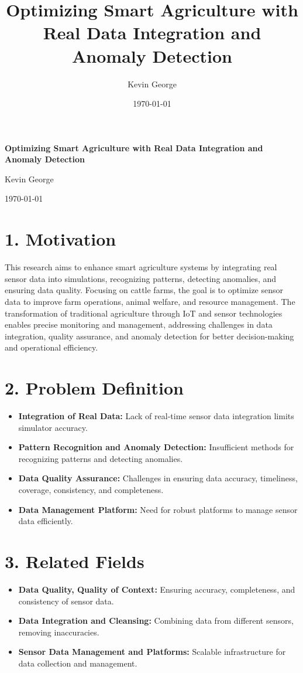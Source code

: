 \documentclass[12pt]{article}
\title{Optimizing Smart Agriculture with Real Data Integration and Anomaly Detection}
\author{Kevin George}
\date{\today}
\begin{document}
\begin{titlepage}
    \centering
    \vspace*{1in}  %
    \huge\textbf{Optimizing Smart Agriculture with Real Data Integration and Anomaly Detection}\par
    \vspace{1in}
    \Large Kevin George\par
    \vspace{0.5in}
    \large \today
    \thispagestyle{empty}
\end{titlepage}

\section*{1. Motivation}
This research aims to enhance smart agriculture systems by integrating real sensor data into simulations, recognizing patterns, detecting anomalies, and ensuring data quality. Focusing on cattle farms, the goal is to optimize sensor data to improve farm operations, animal welfare, and resource management. The transformation of traditional agriculture through IoT and sensor technologies enables precise monitoring and management, addressing challenges in data integration, quality assurance, and anomaly detection for better decision-making and operational efficiency.

\section*{2. Problem Definition}
\begin{itemize}
    \item \textbf{Integration of Real Data:} Lack of real-time sensor data integration limits simulator accuracy.
    \item \textbf{Pattern Recognition and Anomaly Detection:} Insufficient methods for recognizing patterns and detecting anomalies.
    \item \textbf{Data Quality Assurance:} Challenges in ensuring data accuracy, timeliness, coverage, consistency, and completeness.
    \item \textbf{Data Management Platform:} Need for robust platforms to manage sensor data efficiently.
\end{itemize}

\section*{3. Related Fields}
\begin{itemize}
    \item \textbf{Data Quality, Quality of Context:} Ensuring accuracy, completeness, and consistency of sensor data.
    \item \textbf{Data Integration and Cleansing:} Combining data from different sensors, removing inaccuracies.
    \item \textbf{Sensor Data Management and Platforms:} Scalable infrastructure for data collection and management.
\end{itemize}
\end{document}
